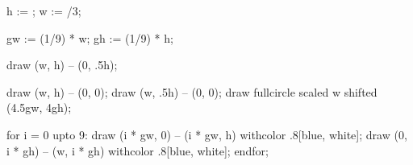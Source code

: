 

	h := \overlayheight;
	w := /3; %

	gw := (1/9) * w;
	gh := (1/9) * h;

	draw (w, h) -- (0, .5h);

	draw (w, h)   -- (0, 0);
	draw (w, .5h) -- (0, 0);
	draw fullcircle scaled w shifted (4.5gw, 4gh);

	for i = 0 upto 9:
		draw (i * gw, 0) -- (i * gw, h) withcolor .8[blue, white];
		draw (0, i * gh) -- (w, i * gh) withcolor .8[blue, white];
	endfor;

\stopuniqueMPgraphic

